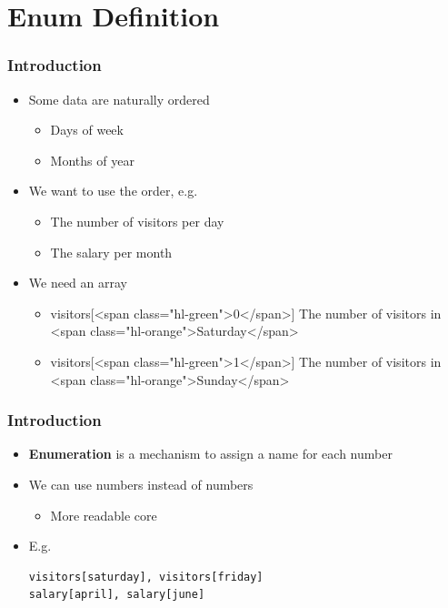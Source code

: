 \documentclass{../c-lecture}
\begin{document}
\section{Enum Definition}

\begin{frame}
  \frametitle{Introduction}
  \begin{itemize}
    \item Some data are naturally ordered
    \begin{itemize}
      \item Days of week
      \item Months of year
    \end{itemize}
    \item We want to use the order, e.g.
    \begin{itemize}
      \item The number of visitors per day
      \item The salary per month
    \end{itemize}
    \item We need an array
    \begin{itemize}
      \item
        visitors[<span class="hl-green">0</span>] \textrightarrow The number of visitors
        in <span class="hl-orange">Saturday</span>

      \item
        visitors[<span class="hl-green">1</span>] \textrightarrow The number of visitors
        in <span class="hl-orange">Sunday</span>

    \end{itemize}
  \end{itemize}
\end{frame}

\begin{frame}[fragile]
  \frametitle{Introduction}
  \begin{itemize}
    \item
      \textbf{\color{YellowOrange} Enumeration} is a mechanism to assign a name
      for each number

    \item We can use numbers instead of numbers
    \begin{itemize}
      \item More readable core
    \end{itemize}
    \item E.g.
    \begin{verbatim}
visitors[saturday], visitors[friday]
salary[april], salary[june]
    \end{verbatim}
  \end{itemize}
\end{frame}
\end{document}
